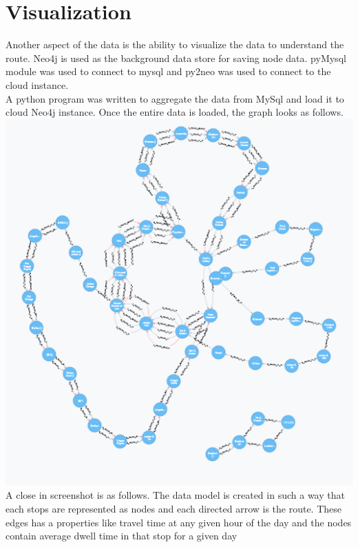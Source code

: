 \documentclass[12pt]{article}\usepackage[]{graphicx}\usepackage[]{color}
\begin{document}
\section{Visualization}
Another aspect of the data is the ability to visualize the data to understand the route. Neo4j is used as the background data store for saving node data. pyMysql module was used to connect to mysql and py2neo was used to connect to the cloud instance.\\
A python program was written to aggregate the data from MySql and load it to cloud Neo4j instance. Once the entire data is loaded, the graph looks as follows.\\
\includegraphics[scale=0.8]{resources/neo4j1}\\[1cm] 
A close in screenshot is as follows. The data model is created in such a way that each stops are represented as nodes and each directed arrow is the route. These edges has a properties like travel time at any given hour of the day and the nodes contain average dwell time in that stop for a given day\\
\end{document}
